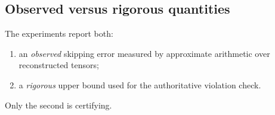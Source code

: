 \subsection{Observed versus rigorous quantities}

The experiments report both:
\begin{enumerate}[label=\arabic*.]
  \item an \emph{observed} skipping error measured by approximate arithmetic over reconstructed tensors;
  \item a \emph{rigorous} upper bound used for the authoritative violation check.
\end{enumerate}
Only the second is certifying.
